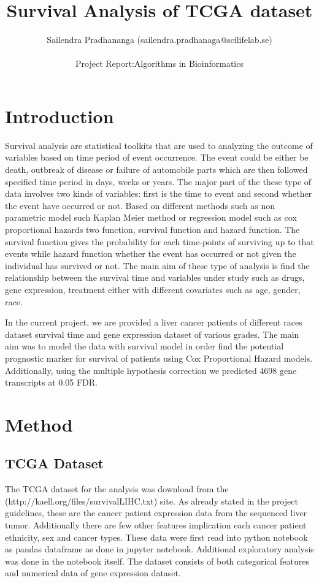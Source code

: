 \documentclass[a4paper,10pt]{article}
\title{Survival Analysis of TCGA dataset}
\author{ Sailendra Pradhananga (sailendra.pradhanaga@scilifelab.se)\\ \\
			Project Report:Algorithms in Bioinformatics}
\begin{document}
\maketitle

\section{Introduction}


Survival analysis are statistical toolkits that are used to analyzing the outcome of variables based on time period of event occurrence. The event could be either be death, outbreak of disease or failure of automobile parts which are then followed specified time period in days, weeks or years. The major part of the these type of data involves two kinds of variables: first is the time to event and second whether the event have occurred or not. Based on different methods such as non parametric model such Kaplan Meier method or regression model such as cox proportional hazards two function, survival function and hazard function. The survival function gives the probability  for each time-points of surviving up to that events while hazard function whether the event has occurred or not  given the individual has survived or not. The main aim of these type of analysis is find the relationship between the survival time and variables under study such as drugs, gene expression, treatment  either with different covariates such as age, gender, race.

In the current project, we are provided a liver cancer patients of different races  dataset survival time and gene expression dataset of various grades. The main aim was to model the data with survival model in order find the potential prognostic marker for survival of patients using Cox Proportional Hazard models. Additionally, using the multiple hypothesis correction we predicted 4698 gene transcripts at 0.05 FDR. 

\section{Method}

	\subsection{TCGA Dataset}
The  TCGA dataset for the analysis was download from the (http://kaell.org/files/survivalLIHC.txt) site. As already stated in the project guidelines, these are the cancer patient expression data from the sequenced liver tumor.  Additionally there are few other features implication each cancer patient ethnicity, sex and cancer types.  These data were first read into python notebook as pandas dataframe  as done in  jupyter notebook.  Additional exploratory analysis was done in the notebook itself. The  dataset consists of both categorical features and numerical data of gene expression dataset. 
\end{document}
